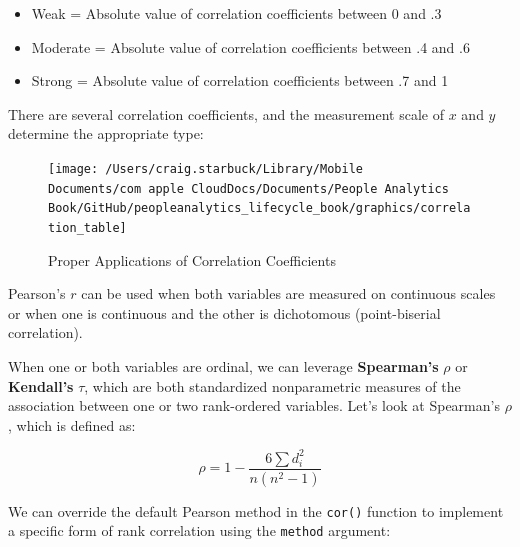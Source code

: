 \documentclass[]{book}
\newenvironment{Shaded}{\begin{snugshade}}{\end{snugshade}}
\newcommand{\CommentTok}[1]{\textcolor[rgb]{0.56,0.35,0.01}{\textit{#1}}}
\newcommand{\DataTypeTok}[1]{\textcolor[rgb]{0.13,0.29,0.53}{#1}}
\newcommand{\KeywordTok}[1]{\textcolor[rgb]{0.13,0.29,0.53}{\textbf{#1}}}
\newcommand{\NormalTok}[1]{#1}
\newcommand{\OperatorTok}[1]{\textcolor[rgb]{0.81,0.36,0.00}{\textbf{#1}}}
\newcommand{\StringTok}[1]{\textcolor[rgb]{0.31,0.60,0.02}{#1}}
\providecommand{\tightlist}{%
  \setlength{\itemsep}{0pt}\setlength{\parskip}{0pt}}
\begin{document}
\begin{itemize}
\tightlist
\item
  Weak = Absolute value of correlation coefficients between 0 and .3
\item
  Moderate = Absolute value of correlation coefficients between .4 and .6
\item
  Strong = Absolute value of correlation coefficients between .7 and 1
\end{itemize}

There are several correlation coefficients, and the measurement scale of \(x\) and \(y\) determine the appropriate type:

\begin{figure}

{\centering \texttt{[image: /Users/craig.starbuck/Library/Mobile Documents/com~apple~CloudDocs/Documents/People Analytics Book/GitHub/peopleanalytics\_lifecycle\_book/graphics/correlation\_table]} 

}

\caption{Proper Applications of Correlation Coefficients}\label{fig:corr-table}
\end{figure}

Pearson's \(r\) can be used when both variables are measured on continuous scales or when one is continuous and the other is dichotomous (point-biserial correlation).

When one or both variables are ordinal, we can leverage \textbf{Spearman's} \(\rho\) or \textbf{Kendall's} \(\tau\), which are both standardized nonparametric measures of the association between one or two rank-ordered variables. Let's look at Spearman's \(\rho\), which is defined as:

\[ \rho = 1 - {\frac {6 \sum d_i^2}{n(n^2 - 1)}} \]

We can override the default Pearson method in the \texttt{cor()} function to implement a specific form of rank correlation using the \texttt{method} argument:

\begin{Shaded}
\end{Shaded}
\end{document}
